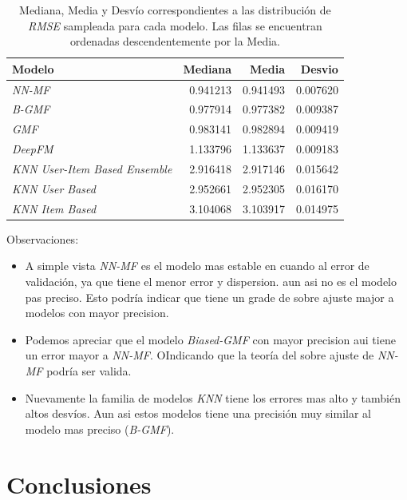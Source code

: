 \documentclass[11pt,a4paper,twoside]{thesis}
\begin{document}
\begin{table}[!htb]
	\centering
	\footnotesize
	\begin{tabular}{lrrr}
		\hline
			Modelo                       & Mediana  & Media    & Desvio  \\
		\hline
		\textit{NN-MF}                        & 0.941213 & 0.941493 & 0.007620 \\
		\textit{B-GMF}                        & 0.977914 & 0.977382 & 0.009387 \\
		\textit{GMF}                          & 0.983141 & 0.982894 & 0.009419 \\
		\textit{DeepFM}                       & 1.133796 & 1.133637 & 0.009183 \\
		\textit{KNN User-Item Based Ensemble} & 2.916418 & 2.917146 & 0.015642 \\
		\textit{KNN User Based}               & 2.952661 & 2.952305 & 0.016170 \\
		\textit{KNN Item Based}               & 3.104068 & 3.103917 & 0.014975 \\
		\hline
	\end{tabular}
	\caption{
		Mediana, Media y Desvío correspondientes a las distribución de 
		\textit{RMSE} sampleada para cada modelo. Las filas se encuentran ordenadas  descendentemente por la Media.
	}
	\label{table:tab}
\end{table}

\begin{description}
	\item[Observaciones:]
\end{description}
\begin{itemize}
\item A simple vista \textit{NN-MF} es el modelo mas estable en cuando al error de validación, ya que tiene el menor error y dispersion. aun asi no es el modelo pas preciso. Esto podría indicar que tiene un grade de sobre ajuste major a modelos con mayor precision.
\item Podemos apreciar que el modelo \textit{Biased-GMF} con mayor precision aui tiene un error mayor a \textit{NN-MF}. OIndicando que la teoría del sobre ajuste de \textit{NN-MF} podría ser valida.
\item Nuevamente la familia de modelos \textit{KNN} tiene los errores mas alto y también altos desvíos. Aun asi estos modelos tiene una precisión muy similar al modelo mas preciso (\textit{B-GMF}).
\end{itemize}


\chapter{Conclusiones}
\end{document}
